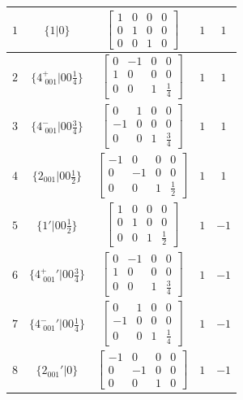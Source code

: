 \documentclass[fleqn,8pt]{jsarticle}
\begin{document}
\begin{longtable}{ccccc}
$ 1 $ & $ \{1|0\} $ & $ \begin{bmatrix} 1 & 0 & 0 & 0 \\ 0 & 1 & 0 & 0 \\ 0 & 0 & 1 & 0 \end{bmatrix} $ & $ 1 $ & $ 1 $ \\ \hline
$ 2 $ & $ \{4^{+}_{\,\,001}|0 0 \frac{1}{4}\} $ & $ \begin{bmatrix} 0 & -1 & 0 & 0 \\ 1 & 0 & 0 & 0 \\ 0 & 0 & 1 & \frac{1}{4} \end{bmatrix} $ & $ 1 $ & $ 1 $ \\ \hline
$ 3 $ & $ \{4^{-}_{\,\,001}|0 0 \frac{3}{4}\} $ & $ \begin{bmatrix} 0 & 1 & 0 & 0 \\ -1 & 0 & 0 & 0 \\ 0 & 0 & 1 & \frac{3}{4} \end{bmatrix} $ & $ 1 $ & $ 1 $ \\ \hline
$ 4 $ & $ \{2{}_{001}|0 0 \frac{1}{2}\} $ & $ \begin{bmatrix} -1 & 0 & 0 & 0 \\ 0 & -1 & 0 & 0 \\ 0 & 0 & 1 & \frac{1}{2} \end{bmatrix} $ & $ 1 $ & $ 1 $ \\ \hline
$ 5 $ & $ \{1{}'|0 0 \frac{1}{2}\} $ & $ \begin{bmatrix} 1 & 0 & 0 & 0 \\ 0 & 1 & 0 & 0 \\ 0 & 0 & 1 & \frac{1}{2} \end{bmatrix} $ & $ 1 $ & $ -1 $ \\ \hline
$ 6 $ & $ \{4^{+}_{\,\,001}{}'|0 0 \frac{3}{4}\} $ & $ \begin{bmatrix} 0 & -1 & 0 & 0 \\ 1 & 0 & 0 & 0 \\ 0 & 0 & 1 & \frac{3}{4} \end{bmatrix} $ & $ 1 $ & $ -1 $ \\ \hline
$ 7 $ & $ \{4^{-}_{\,\,001}{}'|0 0 \frac{1}{4}\} $ & $ \begin{bmatrix} 0 & 1 & 0 & 0 \\ -1 & 0 & 0 & 0 \\ 0 & 0 & 1 & \frac{1}{4} \end{bmatrix} $ & $ 1 $ & $ -1 $ \\ \hline
$ 8 $ & $ \{2{}_{001}{}'|0\} $ & $ \begin{bmatrix} -1 & 0 & 0 & 0 \\ 0 & -1 & 0 & 0 \\ 0 & 0 & 1 & 0 \end{bmatrix} $ & $ 1 $ & $ -1 $ \\
\end{longtable}
\end{document}
